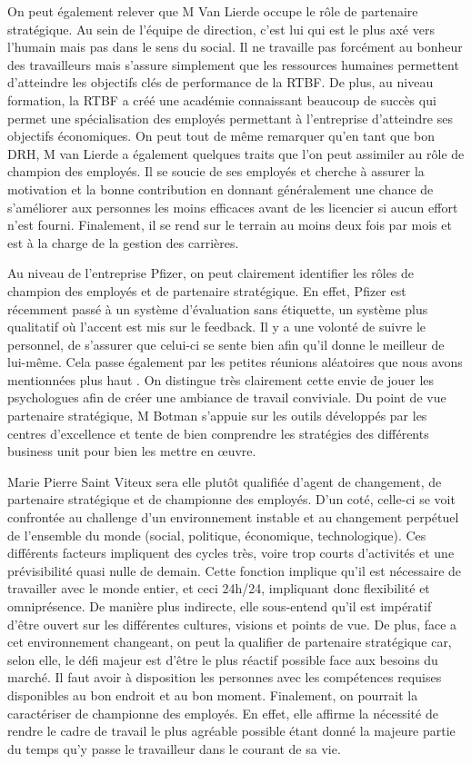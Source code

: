 \documentclass[a4paper, 12pt]{article}
\begin{document}
On peut également relever que M Van Lierde occupe le rôle de partenaire stratégique. Au sein de l'équipe de direction, c'est lui qui est le plus axé vers l'humain mais pas dans le sens du social. Il ne travaille pas forcément au bonheur des travailleurs mais s'assure simplement que les ressources humaines permettent d'atteindre les objectifs clés de performance de la RTBF.  De plus, au niveau formation, la RTBF a créé une académie connaissant beaucoup de succès qui permet une spécialisation des employés permettant à l'entreprise d'atteindre ses objectifs économiques. 
On peut tout de même remarquer qu'en tant que bon DRH, M van Lierde a également quelques traits que l'on peut assimiler au rôle de champion des employés. Il se soucie de ses employés et cherche  à assurer la motivation et la bonne contribution en  donnant généralement une chance de s'améliorer aux personnes les moins efficaces avant de les licencier si aucun effort n'est fourni. Finalement, il se rend sur le terrain au moins deux fois par mois et est à la charge de la gestion des carrières.

Au niveau de l'entreprise Pfizer, on peut clairement identifier les rôles de champion des employés et de partenaire stratégique. En effet, Pfizer est récemment passé à un système d'évaluation sans étiquette, un système plus qualitatif où l'accent est mis sur le feedback. Il y a une volonté de suivre le personnel, de s'assurer que celui-ci se sente bien afin qu'il donne le meilleur de lui-même. Cela passe également par les petites réunions aléatoires que nous avons mentionnées plus haut . On distingue très clairement cette envie de jouer les psychologues afin de créer une ambiance de travail conviviale.
Du point de vue partenaire stratégique,  M Botman s'appuie sur les outils développés par les centres d'excellence et tente de bien comprendre les stratégies des différents business unit pour bien les mettre en œuvre.

Marie Pierre Saint Viteux sera elle plutôt qualifiée d'agent de changement, de partenaire stratégique et de championne des employés. D'un coté, celle-ci se voit confrontée au challenge d'un environnement instable et au changement perpétuel de l'ensemble du monde (social, politique, économique, technologique). Ces différents facteurs impliquent des cycles très, voire trop courts d'activités et une prévisibilité quasi nulle de demain. Cette fonction implique qu'il est nécessaire de travailler avec le monde entier, et ceci 24h/24, impliquant donc flexibilité et omniprésence. De manière plus indirecte, elle sous-entend qu'il est impératif d'être ouvert sur les différentes cultures, visions et points de vue.  De plus, face a cet environnement changeant, on peut la qualifier de partenaire stratégique car, selon elle, le défi majeur est  d'être le plus réactif possible face aux besoins du marché. Il faut avoir à disposition les personnes avec les compétences requises disponibles au bon endroit et au bon moment.
Finalement, on pourrait la caractériser de championne des employés. En effet, elle affirme la nécessité de rendre le cadre de travail le plus agréable possible étant donné la majeure partie du temps qu'y passe le travailleur dans le courant de sa vie.
\end{document}
